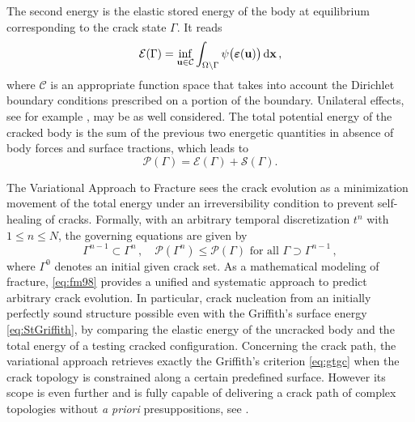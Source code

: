 The second energy is the elastic stored energy of the body at equilibrium corresponding to the crack state $\Gamma$. It reads
\begin{equation} \label{eq:EGamma}
\mathcal{E}(\Gamma)=\inf_{\vec{u}\in\mathcal{C}}\int_{\Omega\setminus\Gamma}\psi\bigl(\eps(\vec{u})\bigr)\dx\,,
\end{equation}
where $\mathcal{C}$ is an appropriate function space that takes into account the Dirichlet boundary conditions prescribed on a portion of the boundary. Unilateral effects, see for example \cite{FrancfortMarigo:1998,AmorMarigoMaurini:2009}, may be as well considered. The total potential energy of the cracked body is the sum of the previous two energetic quantities in absence of body forces and surface tractions, which leads to
\begin{equation} \label{eq:PES}
\mathcal{P}(\Gamma)=\mathcal{E}(\Gamma)+\mathcal{S}(\Gamma).
\end{equation}

The Variational Approach to Fracture sees the crack evolution as a minimization movement of the total energy under an irreversibility condition to prevent self-healing of cracks. Formally, with an arbitrary temporal discretization $t^n$ with $1\leq n\leq N$, the governing equations are given by
\begin{equation} \label{eq:fm98}
\Gamma^{n-1}\subset\Gamma^n\,,\quad \mathcal{P}(\Gamma^n)\leq\mathcal{P}(\Gamma)\text{ for all $\Gamma\supset\Gamma^{n-1}$}\,,
\end{equation}
where $\Gamma^0$ denotes an initial given crack set. As a mathematical modeling of fracture, \eqref{eq:fm98} provides a unified and systematic approach to predict arbitrary crack evolution. In particular, crack nucleation from an initially perfectly sound structure possible even with the Griffith's surface energy \eqref{eq:StGriffith}, by comparing the elastic energy of the uncracked body and the total energy of a testing cracked configuration. Concerning the crack path, the variational approach retrieves exactly the Griffith's criterion \eqref{eq:gtgc} when the crack topology is constrained along a certain predefined surface. However its scope is even further and is fully capable of delivering a crack path of complex topologies without \emph{a priori} presuppositions, see \cite{BourdinFrancfortMarigo:2008}.

